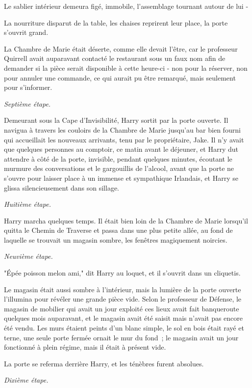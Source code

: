 Le sablier intérieur demeura figé, immobile, l'assemblage tournant autour de lui -

La nourriture disparut de la table, les chaises reprirent leur place, la porte s'ouvrit grand.

La Chambre de Marie était déserte, comme elle devait l'être, car le professeur Quirrell avait auparavant contacté le restaurant sous un faux nom afin de demander si la pièce serait disponible à cette heure-ci - non pour la réserver, non pour annuler une commande, ce qui aurait pu être remarqué, mais seulement pour s'informer.

\emph{Septième étape.}

Demeurant sous la Cape d'Invisibilité, Harry sortit par la porte ouverte. Il navigua à travers les couloirs de la Chambre de Marie jusqu'au bar bien fourni qui accueillait les nouveaux arrivants, tenu par le propriétaire, Jake. Il n'y avait que quelques personnes au comptoir, ce matin avant le déjeuner, et Harry dut attendre à côté de la porte, invisible, pendant quelques minutes, écoutant le murmure des conversations et le gargouillis de l'alcool, avant que la porte ne s'ouvre pour laisser place à un immense et sympathique Irlandais, et Harry se glissa silencieusement dans son sillage.

\emph{Huitième étape.}

Harry marcha quelques temps. Il était bien loin de la Chambre de Marie lorsqu'il quitta le Chemin de Traverse et passa dans une plus petite allée, au fond de laquelle se trouvait un magasin sombre, les fenêtres magiquement noircies.

\emph{Neuvième étape.}

"Épée poisson melon ami," dit Harry au loquet, et il s'ouvrit dans un cliquetis.

Le magasin était aussi sombre à l'intérieur, mais la lumière de la porte ouverte l'illumina pour révéler une grande pièce vide. Selon le professeur de Défense, le magasin de mobilier qui avait un jour exploité ces lieux avait fait banqueroute quelques mois auparavant, et le magasin avait été saisit mais n'avait pas encore été vendu. Les murs étaient peints d'un blanc simple, le sol en bois était rayé et terne, une seule porte fermée ornait le mur du fond~; le magasin avait un jour fonctionné à plein régime, mais il était à présent vide.

La porte se referma derrière Harry, et les ténèbres furent absolues.

\emph{Dixième étape.}

